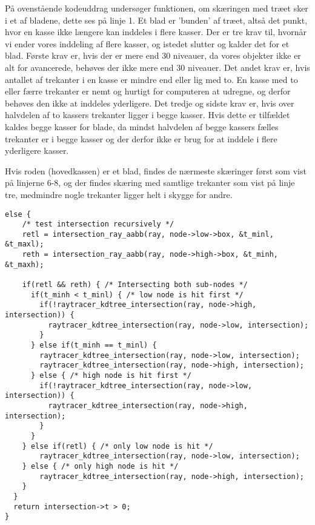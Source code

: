 På ovenstående kodeuddrag undersøger funktionen, om skæringen med træet sker i et af bladene, dette ses på linje 1. Et blad er 'bunden' af træet, altså det punkt, hvor en kasse ikke længere kan inddeles i flere kasser. Der er tre krav til, hvornår vi ender vores inddeling af flere kasser, og istedet slutter og kalder det for et blad. Første krav er, hvis der er mere end 30 niveauer, da vores objekter ikke er alt for avancerede, behøves der ikke mere end 30 niveauer. Det andet krav er, hvis antallet af trekanter i en kasse er mindre end eller lig med to. En kasse med to eller færre trekanter er nemt og hurtigt for computeren at udregne, og derfor behøves den ikke at inddeles yderligere. Det tredje og sidste krav er, hvis over halvdelen af to kassers trekanter ligger i begge kasser. Hvis dette er tilfældet kaldes begge kasser for blade, da mindst halvdelen af begge kassers fælles trekanter er i begge kasser og der derfor ikke er brug for at inddele i flere yderligere kasser.

Hvis roden (hovedkassen) er et blad, findes de nærmeste skæringer først som vist på linjerne 6-8, og der findes skæring med samtlige trekanter som vist på linje tre, medmindre nogle trekanter ligger helt i skygge for andre. 

\begin{lstlisting}[style=Cstyle, caption=else (recursive)]
else {
    /* test intersection recursively */
    retl = intersection_ray_aabb(ray, node->low->box, &t_minl, &t_maxl);
    reth = intersection_ray_aabb(ray, node->high->box, &t_minh, &t_maxh);

    if(retl && reth) { /* Intersecting both sub-nodes */
      if(t_minh < t_minl) { /* low node is hit first */
        if(!raytracer_kdtree_intersection(ray, node->high, intersection)) {
          raytracer_kdtree_intersection(ray, node->low, intersection);
        }
      } else if(t_minh == t_minl) {
        raytracer_kdtree_intersection(ray, node->low, intersection);
        raytracer_kdtree_intersection(ray, node->high, intersection);
      } else { /* high node is hit first */
        if(!raytracer_kdtree_intersection(ray, node->low, intersection)) {
          raytracer_kdtree_intersection(ray, node->high, intersection);
        }
      }
    } else if(retl) { /* only low node is hit */
        raytracer_kdtree_intersection(ray, node->low, intersection);
    } else { /* only high node is hit */
        raytracer_kdtree_intersection(ray, node->high, intersection);
    }
  }
  return intersection->t > 0;
}
\end{lstlisting}

